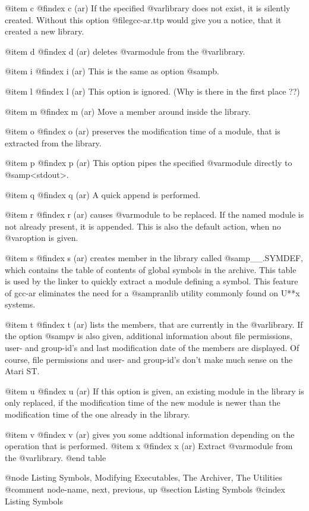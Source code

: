 {{{{{@item c
@findex c (ar)
If the specified @var{library} does not exist, it is silently created.
Without this option @file{gcc-ar.ttp} would give you a notice, that it
created a new library.

@item d
@findex d (ar)
deletes @var{module} from the @var{library}.

@item i
@findex i (ar)
This is the same as option @samp{b}.

@item l
@findex l (ar)
This option is ignored. (Why is there in the first place ??)

@item m
@findex m (ar)
Move a member around inside the library.

@item o
@findex o (ar)
preserves the modification time of a module, that is extracted from the
library.

@item p
@findex p (ar)
This option pipes the specified @var{module} directly to
@samp{<stdout>}.

@item q
@findex q (ar)
A quick append is performed.

@item r
@findex r (ar)
causes @var{module} to be replaced. If the named module is not already
present, it is appended. This is also the default action, when no
@var{option} is given.

@item s
@findex s (ar)
creates member in the library called @samp{__.SYMDEF}, which contains
the table of contents of global symbols in the archive. This table is used by
the linker to quickly extract a module defining a symbol. This feature
of gcc-ar eliminates the need for a @samp{ranlib} utility commonly found
on U**x systems.

@item t
@findex t (ar)
lists the members, that are currently in the @var{library}. If the
option @samp{v} is also given, additional information about file
permissions, user- and group-id's and last modification date of
the members are displayed. Of course, file permissions and user-
and group-id's don't make much sense on the Atari ST.

@item u
@findex u (ar)
If this option is given, an existing module in the library is only
replaced, if the modification time of the new module is newer than the
modification time of the one already in the library.

@item v
@findex v (ar)
gives you some addtional information depending on the operation that
is performed.
@item x
@findex x (ar)
Extract @var{module} from the @var{library}.
@end table

@node     Listing Symbols, Modifying Executables, The Archiver, The Utilities
@comment  node-name,       next,                  previous,     up
@section Listing Symbols
@cindex Listing Symbols

}}}}}
